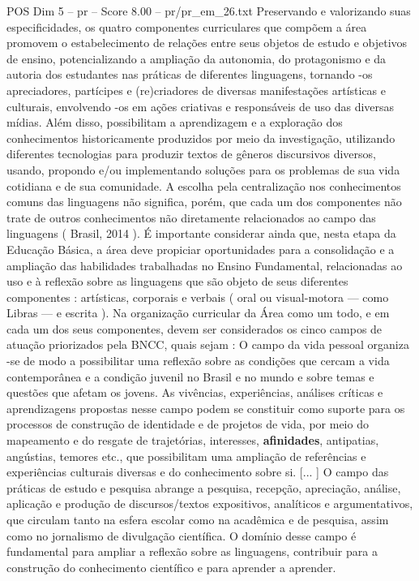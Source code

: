 \begin{textsample}{POS Dim 5 – pr – Score 8.00 – pr/pr\_em\_26.txt}
Preservando e valorizando suas especificidades, os quatro componentes curriculares que compõem a área promovem o estabelecimento de relações entre seus objetos de estudo e objetivos de ensino, potencializando a ampliação da autonomia, do protagonismo e da autoria dos estudantes nas práticas de diferentes linguagens, tornando -os apreciadores, partícipes e (re)criadores de diversas manifestações artísticas e culturais, envolvendo -os em ações criativas e responsáveis de uso das diversas mídias.
Além disso, possibilitam a aprendizagem e a exploração dos conhecimentos historicamente produzidos por meio da investigação, utilizando diferentes tecnologias para produzir textos de gêneros discursivos diversos, usando, propondo e/ou implementando soluções para os problemas de sua vida cotidiana e de sua comunidade.
A escolha pela centralização nos conhecimentos comuns das linguagens não significa, porém, que cada um dos componentes não trate de outros conhecimentos não diretamente relacionados ao campo das linguagens ( Brasil, 2014 ).
É importante considerar ainda que, nesta etapa da Educação Básica, a área deve propiciar oportunidades para a consolidação e a ampliação das habilidades trabalhadas no Ensino Fundamental, relacionadas ao uso e à reflexão sobre as linguagens que são objeto de seus diferentes componentes : artísticas, corporais e verbais ( oral ou visual-motora — como Libras — e escrita ).
Na organização curricular da Área como um todo, e em cada um dos seus componentes, devem ser considerados os cinco campos de atuação priorizados pela BNCC, quais sejam : O campo da vida pessoal organiza -se de modo a possibilitar uma reflexão sobre as condições que cercam a vida contemporânea e a condição juvenil no Brasil e no mundo e sobre temas e questões que afetam os jovens.
As vivências, experiências, análises críticas e aprendizagens propostas nesse campo podem se constituir como suporte para os processos de construção de identidade e de projetos de vida, por meio do mapeamento e do resgate de trajetórias, interesses, \textbf{afinidades}, antipatias, angústias, temores etc., que possibilitam uma ampliação de referências e experiências culturais diversas e do conhecimento sobre si. [... ] O campo das práticas de estudo e pesquisa abrange a pesquisa, recepção, apreciação, análise, aplicação e produção de discursos/textos expositivos, analíticos e argumentativos, que circulam tanto na esfera escolar como na acadêmica e de pesquisa, assim como no jornalismo de divulgação científica.
O domínio desse campo é fundamental para ampliar a reflexão sobre as linguagens, contribuir para a construção do conhecimento científico e para aprender a aprender.

\end{textsample}
